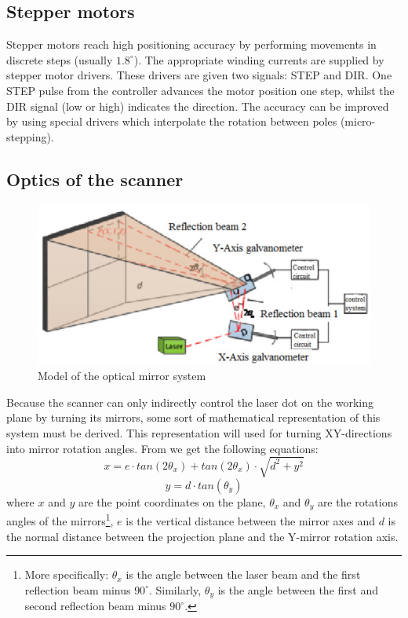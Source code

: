 \documentclass[a4paper, 11pt]{scrartcl}
\begin{document}
\subsection{Stepper motors}
Stepper motors reach high positioning accuracy by performing movements in discrete steps (usually $1.8^\circ$). The appropriate winding currents are supplied by stepper motor drivers. These drivers are given two signals: STEP and DIR. One STEP pulse from the controller advances the motor position one step, whilst the DIR signal (low or high) indicates the direction. The accuracy can be improved by using special drivers which interpolate the rotation between poles (micro-stepping). 

\subsection{Optics of the scanner} 
\begin{figure}[H]
\begin{center}
\includegraphics[width=15cm]{img/optics.png}
\caption{Model of the optical mirror system \cite{Meng.2019}}
\label{optics}
\end{center}
\end{figure}
Because the scanner can only indirectly control the laser dot on the working plane by turning its mirrors, some sort of mathematical representation of this system must be derived. This representation will used for turning XY-directions into mirror rotation angles. From \cite{Meng.2019} we get the following equations:
\begin{equation}\label{eqn1}
x=e\cdot tan(2\theta_x)+tan(2\theta_x) \cdot \sqrt{d^2+y^2} 
\end{equation} 
\begin{equation}\label{eqn2}
y = d\cdot tan(\theta_y)
\end{equation} 
where $x$ and $y$ are the point coordinates on the plane, $\theta_x$ and $\theta_y$ are the rotations angles of the mirrors\footnote{More specifically: $\theta_x$ is the angle between the laser beam and the first reflection beam minus $90^\circ$. Similarly, $\theta_y$ is the angle between the first and second reflection beam minus $90^\circ$.}, $e$ is the vertical distance between the mirror axes and $d$ is the normal distance between the projection plane and the Y-mirror rotation axis. \\
\end{document}
